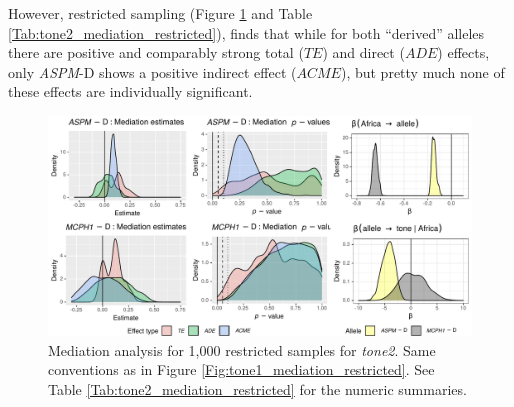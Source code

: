 \documentclass[twoside,onecolumn]{article}
\begin{document}
However, restricted sampling (Figure \ref{Fig:tone2_mediation_restricted} and Table \ref{Tab:tone2_mediation_restricted}), finds that while for both ``derived'' alleles there are positive and comparably strong total ($TE$) and direct ($ADE$) effects, only \textit{ASPM}-D shows a positive indirect effect ($ACME$), but pretty much none of these effects are individually significant.

\begin{figure}[h]
  \centering
  \includegraphics[width=\textwidth]{../../code/figures/tone2_mediation_restricted}
  \caption{Mediation analysis for 1,000 restricted samples for \textit{tone2}. Same conventions as in Figure \ref{Fig:tone1_mediation_restricted}. See Table \ref{Tab:tone2_mediation_restricted} for the numeric summaries.}
  \label{Fig:tone2_mediation_restricted}
\end{figure}
\end{document}
